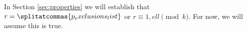 In Section \ref{sec:properties} we will establish that $r=\splitatcommas{{p_exclusions_list}}$ or $r\equiv 1,{ell}\pmod{{k}}$. For now, we will assume this is true.